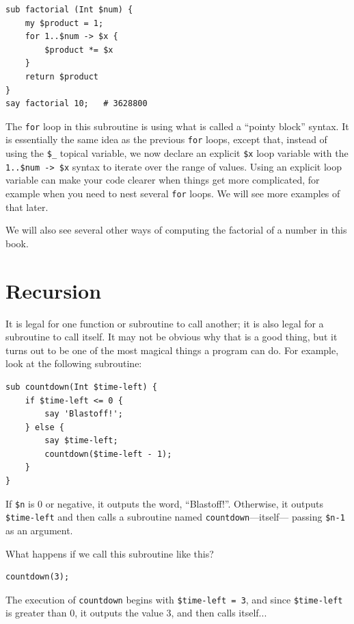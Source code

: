 \begin{verbatim}
sub factorial (Int $num) { 
    my $product = 1;  
    for 1..$num -> $x { 
        $product *= $x
    }
    return $product
}
say factorial 10;   # 3628800
\end{verbatim} 

The {\tt for} loop in this subroutine is using what is called 
a ``pointy block'' syntax. It is essentially the same idea 
as the previous {\tt for} loops, except that, 
instead of using the \verb"$_" topical variable, we 
now declare an explicit \verb"$x" loop variable with the 
\verb"1..$num -> $x" syntax to iterate over the range 
of values. Using an explicit loop variable can make your 
code clearer when things get more complicated, for example 
when you need to nest several {\tt for} loops. We will 
see more examples of that later.

We will also see several other ways of computing the factorial 
of a number in this book.

\section{Recursion}
\label{recursion}

It is legal for one function or subroutine to call another;
it is also legal for a subroutine to call itself.  It may not 
be obvious why that is a good thing, but it turns out to be 
one of the most magical things a program can do. 
For example, look at the following subroutine:

\begin{verbatim}
sub countdown(Int $time-left) {
    if $time-left <= 0 {
        say 'Blastoff!';
    } else {
        say $time-left;
        countdown($time-left - 1);
    }
}
\end{verbatim}
%
If {\tt \$n} is 0 or negative, it outputs the word, 
``Blastoff!''. Otherwise, it outputs {\tt \$time-left} 
and then calls a subroutine named {\tt countdown}---itself---
passing {\tt \$n-1} as an argument.

What happens if we call this subroutine like this?

\begin{verbatim}
countdown(3);
\end{verbatim}
%
The execution of {\tt countdown} begins with {\tt \$time-left 
= 3}, and since {\tt \$time-left} is greater than 0, it 
outputs the value 3, and then calls itself...


